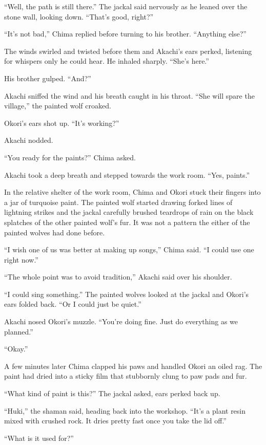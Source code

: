 ``Well, the path is still there.'' The jackal said nervously as he leaned over the stone wall, looking down. ``That's good, right?''

``It's not bad,'' Chima replied before turning to his brother. ``Anything else?''

The winds swirled and twisted before them and Akachi's ears perked, listening for whispers only he could hear. He inhaled sharply. ``She's here.''

His brother gulped. ``And?''

Akachi sniffed the wind and his breath caught in his throat. ``She will spare the village,'' the painted wolf croaked.

Okori's ears shot up. ``It's working?''

Akachi nodded.

``You ready for the paints?'' Chima asked.

Akachi took a deep breath and stepped towards the work room. ``Yes, paints.''

In the relative shelter of the work room, Chima and Okori stuck their fingers into a jar of turquoise paint. The painted wolf started drawing forked lines of lightning strikes and the jackal carefully brushed teardrops of rain on the black splatches of the other painted wolf's fur. It was not a pattern the either of the painted wolves had done before.

``I wish one of us was better at making up songs,'' Chima said. ``I could use one right now.''

``The whole point was to avoid tradition,'' Akachi said over his shoulder.

``I could sing something.'' The painted wolves looked at the jackal and Okori's ears folded back. ``Or I could just be quiet.''

Akachi nosed Okori's muzzle. ``You're doing fine. Just do everything as we planned.''

``Okay.''

A few minutes later Chima clapped his paws and handled Okori an oiled rag. The paint had dried into a sticky film that stubbornly clung to paw pads and fur.

``What kind of paint is this?'' The jackal asked, ears perked back up.

``Huki,'' the shaman said, heading back into the workshop. ``It's a plant resin mixed with crushed rock. It dries pretty fast once you take the lid off.''

``What is it used for?''

